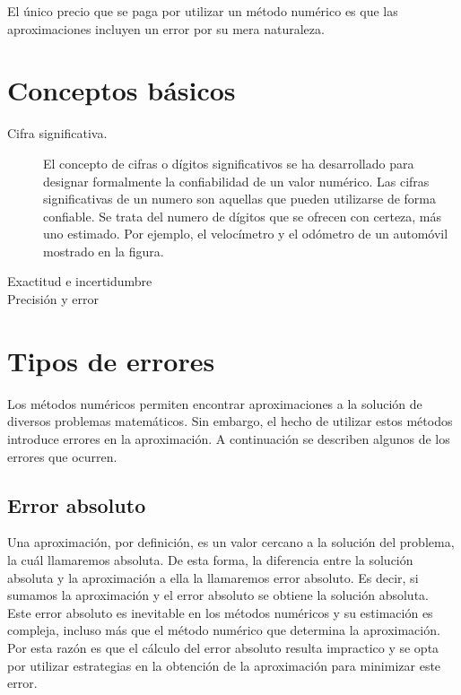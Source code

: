 El único precio que se paga por utilizar un método numérico es que las aproximaciones incluyen un error por su mera naturaleza.


\section{Conceptos básicos}

\begin{description}
	\item[Cifra significativa. ] El concepto de cifras o dígitos significativos se ha desarrollado para designar formalmente la confiabilidad de 
		un valor numérico. Las cifras significativas de un numero son aquellas que pueden utilizarse de forma confiable. Se trata del numero de dígitos 
		que se ofrecen con certeza, más uno estimado. Por ejemplo, el velocímetro y el odómetro de un automóvil mostrado en la figura.
	\item[Exactitud e incertidumbre]
	\item[Precisión y error]
\end{description}


\section{Tipos de errores}
Los métodos numéricos permiten encontrar aproximaciones a la solución de diversos problemas matemáticos. Sin embargo, el hecho de utilizar estos métodos introduce errores en la
aproximación. A continuación se describen algunos de los errores que ocurren.

\subsection{Error absoluto}

Una aproximación, por definición, es un valor cercano a la solución del problema, la cuál llamaremos absoluta. De esta forma, la diferencia entre la solución
absoluta y la aproximación a ella la llamaremos error absoluto. Es decir, si sumamos la aproximación y el error absoluto se obtiene la solución absoluta.\\

Este error absoluto es inevitable en los métodos numéricos y su estimación es compleja, incluso más que el método numérico que determina la aproximación. Por esta razón es que
el cálculo del error absoluto resulta impractico y se opta por utilizar estrategias en la obtención de la aproximación para minimizar este error.

